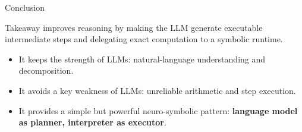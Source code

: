 \begin{frame}{Conclusion}
\begin{block}{Takeaway}
\PAL{} improves reasoning by making the LLM generate executable intermediate steps and delegating exact computation to a symbolic runtime.
\end{block}
\vspace{0.25cm}
\begin{itemize}
  \item It keeps the strength of LLMs: natural-language understanding and decomposition.
  \item It avoids a key weakness of LLMs: unreliable arithmetic and step execution.
  \item It provides a simple but powerful neuro-symbolic pattern: \textbf{language model as planner, interpreter as executor}.
\end{itemize}
\end{frame}
